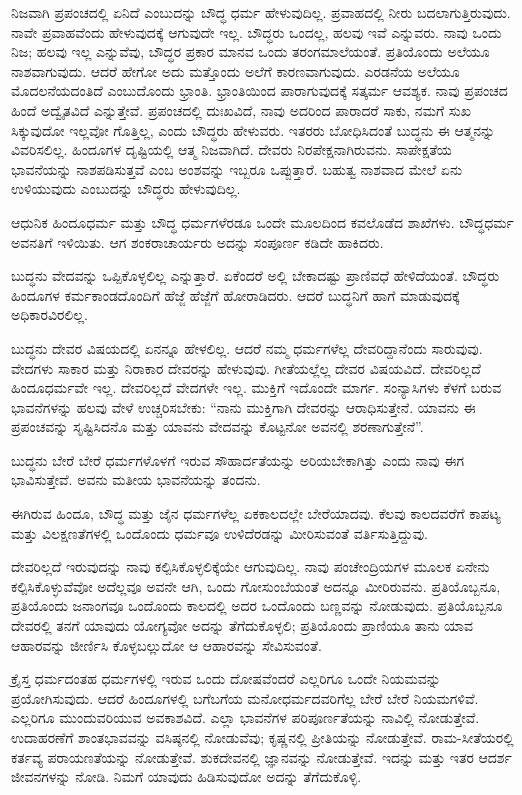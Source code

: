 ನಿಜವಾಗಿ ಪ್ರಪಂಚದಲ್ಲಿ ಏನಿದೆ ಎಂಬುದನ್ನು ಬೌದ್ಧ ಧರ್ಮ ಹೇಳುವುದಿಲ್ಲ. ಪ್ರವಾಹದಲ್ಲಿ ನೀರು ಬದಲಾಗುತ್ತಿರುವುದು. ನಾವೇ ಪ್ರವಾಹವೆಂದು ಹೇಳುವುದಕ್ಕೆ ಆಗುವುದೇ ಇಲ್ಲ. ಬೌದ್ಧರು ಒಂದಲ್ಲ, ಹಲವು ಇವೆ ಎನ್ನುವರು. ನಾವು ಒಂದು ನಿಜ; ಹಲವು ಇಲ್ಲ ಎನ್ನುವೆವು, ಬೌದ್ಧರ ಪ್ರಕಾರ ಮಾನವ ಒಂದು ತರಂಗಮಾಲೆಯಂತೆ. ಪ್ರತಿಯೊಂದು ಅಲೆಯೂ ನಾಶವಾಗುವುದು. ಆದರೆ ಹೇಗೋ ಅದು ಮತ್ತೊಂದು ಅಲೆಗೆ ಕಾರಣವಾಗುವುದು. ಎರಡನೆಯ ಅಲೆಯೂ ಮೊದಲನೆಯದಂತಿದೆ ಎಂಬುದೊಂದು ಭ್ರಾಂತಿ. ಭ್ರಾಂತಿಯಿಂದ ಪಾರಾಗುವುದಕ್ಕೆ ಸತ್ಕರ್ಮ ಆವಶ್ಯಕ. ನಾವು ಪ್ರಪಂಚದ ಹಿಂದೆ ಅದ್ವೈತವಿದೆ ಎನ್ನುತ್ತೇವೆ. ಪ್ರಪಂಚದಲ್ಲಿ ದುಃಖವಿದೆ, ನಾವು ಅದರಿಂದ ಪಾರಾದರೆ ಸಾಕು, ನಮಗೆ ಸುಖ ಸಿಕ್ಕುವುದೋ ಇಲ್ಲವೋ ಗೊತ್ತಿಲ್ಲ, ಎಂದು ಬೌದ್ಧರು ಹೇಳುವರು. ಇತರರು ಬೋಧಿಸಿದಂತೆ ಬುದ್ಧನು ಈ ಆತ್ಮನನ್ನು ವಿವರಿಸಲಿಲ್ಲ. ಹಿಂದೂಗಳ ದೃಷ್ಟಿಯಲ್ಲಿ ಆತ್ಮ ನಿಜವಾಗಿದೆ. ದೇವರು ನಿರಪೇಕ್ಷನಾಗಿರುವನು. ಸಾಪೇಕ್ಷತೆಯ ಭಾವನೆಯನ್ನು ನಾಶಪಡಿಸುತ್ತವೆ ಎಂಬ ಅಂಶವನ್ನು ಇಬ್ಬರೂ ಒಪ್ಪುತ್ತಾರೆ. ಬಹುತ್ವ ನಾಶವಾದ ಮೇಲೆ ಏನು ಉಳಿಯುವುದು ಎಂಬುದನ್ನು ಬೌದ್ಧರು ಹೇಳುವುದಿಲ್ಲ.

ಆಧುನಿಕ ಹಿಂದೂಧರ್ಮ ಮತ್ತು ಬೌದ್ಧ ಧರ್ಮಗಳೆರಡೂ ಒಂದೇ ಮೂಲದಿಂದ ಕವಲೊಡೆದ ಶಾಖೆಗಳು. ಬೌದ್ಧಧರ್ಮ ಅವನತಿಗೆ ಇಳಿಯಿತು. ಆಗ ಶಂಕರಾಚಾರ್ಯರು ಅದನ್ನು ಸಂಪೂರ್ಣ ಕಡಿದೇ ಹಾಕಿದರು.

ಬುದ್ಧನು ವೇದವನ್ನು ಒಪ್ಪಿಕೊಳ್ಳಲಿಲ್ಲ ಎನ್ನುತ್ತಾರೆ. ಏಕೆಂದರೆ ಅಲ್ಲಿ ಬೇಕಾದಷ್ಟು ಪ್ರಾಣಿವಧೆ ಹೇಳಿದೆಯಂತೆ. ಬೌದ್ಧರು ಹಿಂದೂಗಳ ಕರ್ಮಕಾಂಡದೊಂದಿಗೆ ಹೆಜ್ಜೆ ಹೆಜ್ಜೆಗೆ ಹೋರಾಡಿದರು. ಆದರೆ ಬುದ್ಧನಿಗೆ ಹಾಗೆ ಮಾಡುವುದಕ್ಕೆ ಅಧಿಕಾರವಿರಲಿಲ್ಲ.

ಬುದ್ಧನು ದೇವರ ವಿಷಯದಲ್ಲಿ ಏನನ್ನೂ ಹೇಳಲಿಲ್ಲ. ಆದರೆ ನಮ್ಮ ಧರ್ಮಗಳೆಲ್ಲ ದೇವರಿದ್ದಾನೆಂದು ಸಾರುವುವು. ವೇದಗಳು ಸಾಕಾರ ಮತ್ತು ನಿರಾಕಾರ ದೇವರನ್ನು ಹೇಳುವುವು. ಗೀತೆಯಲ್ಲೆಲ್ಲ ದೇವರ ವಿಷಯವಿದೆ. ದೇವರಿಲ್ಲದೆ ಹಿಂದೂಧರ್ಮವೇ ಇಲ್ಲ. ದೇವರಿಲ್ಲದೆ ವೇದಗಳೇ ಇಲ್ಲ. ಮುಕ್ತಿಗೆ ಇದೊಂದೇ ಮಾರ್ಗ. ಸಂನ್ಯಾಸಿಗಳು ಕೆಳಗೆ ಬರುವ ಭಾವನೆಗಳನ್ನು ಹಲವು ವೇಳೆ ಉಚ್ಚರಿಸಬೇಕು: “ನಾನು ಮುಕ್ತಿಗಾಗಿ ದೇವರನ್ನು ಆರಾಧಿಸುತ್ತೇನೆ. ಯಾವನು ಈ ಪ್ರಪಂಚವನ್ನು ಸೃಷ್ಟಿಸಿದನೊ ಮತ್ತು ಯಾವನು ವೇದವನ್ನು ಕೊಟ್ಟನೋ ಅವನಲ್ಲಿ ಶರಣಾಗುತ್ತೇನೆ”.

ಬುದ್ಧನು ಬೇರೆ ಬೇರೆ ಧರ್ಮಗಳೊಳಗೆ ಇರುವ ಸೌಹಾರ್ದತೆಯನ್ನು ಅರಿಯಬೇಕಾಗಿತ್ತು ಎಂದು ನಾವು ಈಗ ಭಾವಿಸುತ್ತೇವೆ. ಅವನು ಮತೀಯ ಭಾವನೆಯನ್ನು ತಂದನು.

ಈಗಿರುವ ಹಿಂದೂ, ಬೌದ್ಧ ಮತ್ತು ಜೈನ ಧರ್ಮಗಳೆಲ್ಲ ಏಕಕಾಲದಲ್ಲೇ ಬೇರೆಯಾದವು. ಕೆಲವು ಕಾಲದವರೆಗೆ ಕಾಪಟ್ಯ ಮತ್ತು ವಿಲಕ್ಷಣತೆಗಳಲ್ಲಿ ಒಂದೊಂದು ಧರ್ಮವೂ ಉಳಿದೆರಡನ್ನು ಮೀರಿಸುವಂತೆ ವರ್ತಿಸುತ್ತಿದ್ದುವು.

ದೇವರಿಲ್ಲದೆ ಇರುವುದನ್ನು ನಾವು ಕಲ್ಪಿಸಿಕೊಳ್ಳಲಿಕ್ಕೆಯೇ ಆಗುವುದಿಲ್ಲ. ನಾವು ಪಂಚೇಂದ್ರಿಯಗಳ ಮೂಲಕ ಏನೇನು ಕಲ್ಪಿಸಿಕೊಳ್ಳುವೆವೋ ಅದೆಲ್ಲವೂ ಅವನೇ ಆಗಿ, ಒಂದು ಗೋಸುಂಬೆಯಂತೆ ಅದನ್ನೂ ಮೀರಿರುವನು. ಪ್ರತಿಯೊಬ್ಬನೂ, ಪ್ರತಿಯೊಂದು ಜನಾಂಗವೂ ಒಂದೊಂದು ಕಾಲದಲ್ಲಿ ಅದರ ಒಂದೊಂದು ಬಣ್ಣವನ್ನು ನೋಡುವುದು. ಪ್ರತಿಯೊಬ್ಬನೂ ದೇವರಲ್ಲಿ ತನಗೆ ಯಾವುದು ಯೋಗ್ಯವೋ ಅದನ್ನು ತೆಗೆದುಕೊಳ್ಳಲಿ; ಪ್ರತಿಯೊಂದು ಪ್ರಾಣಿಯೂ ತಾನು ಯಾವ ಆಹಾರವನ್ನು ಜೀರ್ಣಿಸಿ ಕೊಳ್ಳಬಲ್ಲುದೋ ಆ ಆಹಾರವನ್ನು ಸೇವಿಸುವಂತೆ.

ಕ್ರೈಸ್ತ ಧರ್ಮದಂತಹ ಧರ್ಮಗಳಲ್ಲಿ ಇರುವ ಒಂದು ದೋಷವೆಂದರೆ ಎಲ್ಲರಿಗೂ ಒಂದೇ ನಿಯಮವನ್ನು ಪ್ರಯೋಗಿಸುವುದು. ಆದರೆ ಹಿಂದೂಗಳಲ್ಲಿ ಬಗೆಬಗೆಯ ಮನೋಧರ್ಮದವರಿಗೆಲ್ಲ ಬೇರೆ ಬೇರೆ ನಿಯಮಗಳಿವೆ. ಎಲ್ಲರಿಗೂ ಮುಂದುವರಿಯುವ ಅವಕಾಶವಿದೆ. ಎಲ್ಲಾ ಭಾವನೆಗಳ ಪರಿಪೂರ್ಣತೆಯನ್ನು ನಾವಿಲ್ಲಿ ನೋಡುತ್ತೇವೆ. ಉದಾಹರಣೆಗೆ ಶಾಂತಭಾವವನ್ನು ವಸಿಷ್ಠನಲ್ಲಿ ನೋಡುವೆವು; ಕೃಷ್ಣನಲ್ಲಿ ಪ್ರೀತಿಯನ್ನು ನೋಡುತ್ತೇವೆ. ರಾಮ-ಸೀತೆಯರಲ್ಲಿ ಕರ್ತವ್ಯ ಪರಾಯಣತೆಯನ್ನು ನೋಡುತ್ತೇವೆ. ಶುಕದೇವನಲ್ಲಿ ಜ್ಞಾನವನ್ನು ನೋಡುತ್ತೇವೆ. ಇದನ್ನು ಮತ್ತು ಇತರ ಆದರ್ಶ ಜೀವನಗಳನ್ನು ನೋಡಿ. ನಿಮಗೆ ಯಾವುದು ಹಿಡಿಸುವುದೋ ಅದನ್ನು ತೆಗೆದುಕೊಳ್ಳಿ.

